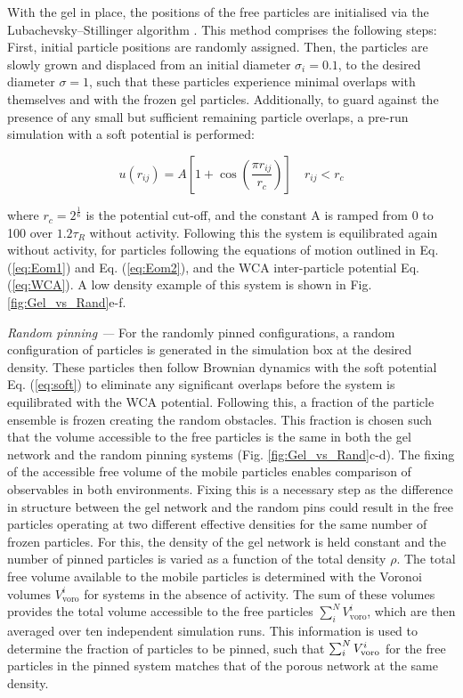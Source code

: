 With the gel in place, the positions of the free particles are initialised via the Lubachevsky--Stillinger algorithm \cite{lubachevsky1990}. This method comprises the following steps: First, initial particle positions are randomly assigned. Then, the particles are slowly grown and displaced from an initial diameter $\sigma_{i}=0.1$, to the desired diameter $\sigma=1$, such that these particles experience minimal overlaps with themselves and with the frozen gel particles. Additionally, to guard against the presence of any small but sufficient remaining particle overlaps, a pre-run simulation with a soft potential is performed: 


\begin{equation}
u(r_{ij})=A\left[1+\cos \left(\frac{\pi r_{ij}}{r_{c}}\right)\right] \quad r_{ij}<r_{c}
\label{eq:soft}
\end{equation}


\noindent
where $r_c = 2^\frac{1}{6}$ is the potential cut-off, and the constant A is ramped from 0 to 100 over $1.2 \tau_R$ without activity. Following this the system is equilibrated again without activity, for particles following the equations of motion outlined in Eq. (\ref{eq:Eom1}) and Eq. (\ref{eq:Eom2}), and the WCA inter-particle potential Eq. (\ref{eq:WCA}). A low density example of this system is shown in Fig. \ref{fig:Gel_vs_Rand}e-f.


\textit{Random pinning ---}
For the randomly pinned configurations, a random configuration of particles is generated in the simulation box at the desired density. These particles then follow Brownian dynamics with the soft potential Eq. (\ref{eq:soft})  to eliminate any significant overlaps before the system is equilibrated with the WCA potential. Following this, a fraction of the particle ensemble is frozen creating the random obstacles. This fraction is chosen such that the volume accessible to the free particles is the same in both the gel network and the random pinning systems (Fig. \ref{fig:Gel_vs_Rand}c-d).
The fixing of the accessible free volume of the mobile particles enables comparison of observables in both environments. Fixing this is a necessary step as the difference in structure between the gel network and the random pins could result in the free particles operating at two different effective densities for the same number of frozen particles. 
For this, the density of the gel network is held constant and the number of pinned particles is varied as a function of the total density $\rho$. The total free volume available to the mobile particles is determined with the Voronoi volumes $V^i_{\textrm{voro}}$ for systems in the absence of activity. The sum of these volumes provides the total volume accessible to the free particles $\sum_{i}^N V^i_{\textrm{voro}}$, which are then averaged over ten independent simulation runs. This information is used to determine the fraction of particles to be pinned, such that $\sum_{i}^N V^i_{\textrm{\textrm{voro}}}$ for the free particles in the pinned system matches that of the porous network at the same density.  


